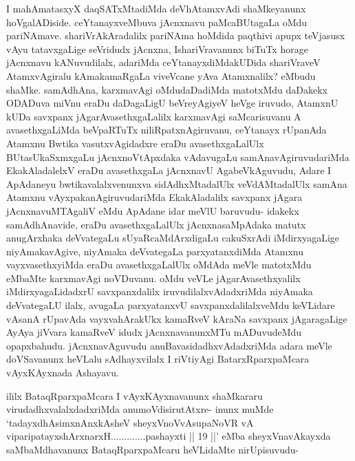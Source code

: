 
\begin{artha}
I mahAmatasxyX daqSATxMtadiMda deVhAtamxvAdi shaMkeyanunx hoVgalADiside. ceYtanayxveMbuva jAcnxnavu paMcaBUtagaLa oMdu pariNAmave. shariVrAkAradalilx pariNAma hoMdida paqthivi apupx teVjasusx vAyu tatavxgaLige seVridudx jAcnxna, IshariVravanunx biTuTx horage jAcnxnavu kANuvudilalx, adariMda ceYtanayxdiMdakUDida shariVraveV AtamxvAgiralu kAmakamaRgaLa viveVcane yAva Atamxnalilx? eMbudu shaMke. samAdhAna, karxmavAgi oMdudaDadiMda matotxMdu daDakekx ODADuva miVnu eraDu daDagaLigU beVreyAgiyeV heVge iruvudo, AtamxnU kUDa savxpanx jAgarAvasethxgaLalilx karxmavAgi saMcarisuvanu A avasethxgaLiMda beVpaRTuTx niliRpatxnAgiruvanu, ceYtanayx rUpanAda Atamxnu Bwtika vasutxvAgidadxre eraDu avasethxgaLalUlx BUtasUkaSxmxgaLu jAcnxnoVtApxdaka vAdavugaLu samAnavAgiruvudariMda EkakAladalelxV eraDu avasethxgaLa jAcnxnavU AgabeVkAguvudu, Adare I ApAdaneyu bwtikavalalxvenunxva sidAdhxMtadalUlx  veVdAMtadalUlx samAna Atamxnu vAyxpakanAgiruvudariMda EkakAladalilx savxpanx jAgara jAcnxnavuMTAgaliV eMdu ApAdane idar meVlU baruvudu- idakekx samAdhAnavide, eraDu avasethxgaLalUlx jAcnxnasaMpAdaka matutx anugArxhaka deVvategaLu sUyaRcaMdArxdigaLu cakuSxrAdi iMdirxyagaLige niyAmakavAgive, niyAmaka deVvategaLa parxyatanxdiMda Atamxnu vayxvasethxyiMda eraDu avasethxgaLalUlx oMdAda meVle matotxMdu eMbaMte karxmavAgi noVDuvanu. oMdu veVLe jAgarAvasethxyalilx iMdirxyagaLidadxrU savxpanxdalilx iruvudilalxvAdadxriMda niyAmaka deVvategaLU ilalx, avugaLa parxyatanxvU savxpanxdalilalxveMdu keVLidare vAsanA rUpavAda vayxvahArakUkx kamaRveV kAraNa savxpanx jAgaragaLige AyAya jiVvara kamaRveV idudx jAcnxnavanunxMTu mADuvudeMdu opapxbahudu. jAcnxnavAguvudu anuBavasidadhxvAdadxriMda adara meVle doVSavanunx heVLalu sAdhayxvilalx I riVtiyAgi BatarxRparxpaMcara vAyxKAyxnada Ashayavu. 
\end{artha}%


\begin{artha}
ililx BataqRparxpaMcara I vAyxKAyxnavanunx shaMkararu virudadhxvalalxdadxriMda anumoVdisirutAtxre- inunx muMde `tadayxdhA\s simxnAnxkAsheV sheyxVnoVvAsupaNoVR vA viparipatayxshArxnarxH.............pashayxti || 19 ||' eMba sheyxVnavAkayxda saMbaMdhavanunx BataqRparxpaMcaru heVLidaMte nirUpisuvudu-
\end{artha}


